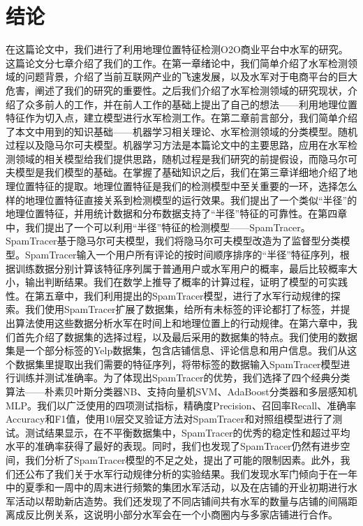 
\chapter{结论}
\label{chap:concl}


在这篇论文中，我们进行了利用地理位置特征检测O2O商业平台中水军的研究。这篇论文分七章介绍了我们的工作。在第一章绪论中，我们简单介绍了水军检测领域的问题背景，介绍了当前互联网产业的飞速发展，以及水军对于电商平台的巨大危害，阐述了我们的研究的重要性。之后我们介绍了水军检测领域的研究现状，介绍了众多前人的工作，并在前人工作的基础上提出了自己的想法——利用地理位置特征作为切入点，建立模型进行水军检测工作。在第二章前言部分，我们简单介绍了本文中用到的知识基础——机器学习相关理论、水军检测领域的分类模型。随机过程以及隐马尔可夫模型。机器学习方法是本篇论文中的主要思路，应用在水军检测领域的相关模型给我们提供思路，随机过程是我们研究的前提假设，而隐马尔可夫模型是我们模型的基础。在掌握了基础知识之后，我们在第三章详细地介绍了地理位置特征的提取。地理位置特征是我们的检测模型中至关重要的一环，选择怎么样的地理位置特征直接关系到检测模型的运行效果。我们提出了一个类似“半径”的地理位置特征，并用统计数据和分布数据支持了“半径”特征的可靠性。在第四章中，我们提出了一个可以利用“半径”特征的检测模型——SpamTracer。SpamTracer基于隐马尔可夫模型，我们将隐马尔可夫模型改造为了监督型分类模型。SpamTracer输入一个用户所有评论的按时间顺序排序的“半径”特征序列，根据训练数据分别计算该特征序列属于普通用户或水军用户的概率，最后比较概率大小，输出判断结果。我们在数学上推导了概率的计算过程，证明了模型的可实践性。在第五章中，我们利用提出的SpamTracer模型，进行了水军行动规律的探索。我们使用SpamTracer扩展了数据集，给所有未标签的评论都打了标签，并提出算法使用这些数据分析水军在时间上和地理位置上的行动规律。在第六章中，我们首先介绍了数据集的选择过程，以及最后采用的数据集的特点。我们使用的数据集是一个部分标签的Yelp数据集，包含店铺信息、评论信息和用户信息。我们从这个数据集里提取出我们需要的特征序列，将带标签的数据输入SpamTracer模型进行训练并测试准确率。为了体现出SpamTracer的优势，我们选择了四个经典分类算法——朴素贝叶斯分类器NB、支持向量机SVM、AdaBoost分类器和多层感知机MLP。我们以广泛使用的四项测试指标，精确度Precision、召回率Recall、准确率Accuracy和F1值，使用10层交叉验证方法对SpamTracer和对照组模型进行了测试。测试结果显示，在不平衡数据集中，SpamTracer的优秀的稳定性和超过平均水平的准确率获得了最好的表现。同时，我们也发现了SpamTracer仍然有进步空间，我们分析了SpamTracer模型的不足之处，提出了可能的限制因素。此外，我们还公布了我们关于水军行动规律分析的实验结果。我们发现水军门倾向于在一年中的夏季和一周中的周末进行频繁的集团水军活动，以及在店铺的开业初期进行水军活动以帮助新店造势。我们还发现了不同店铺间共有水军的数量与店铺的间隔距离成反比例关系，这说明小部分水军会在一个小商圈内与多家店铺进行合作。

